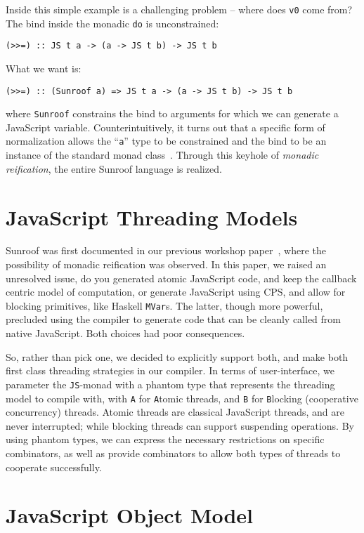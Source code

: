 \documentclass{llncs}
\newcommand{\Src}[1]{{\tt{#1}}}
\newcommand{\JS}{\Src{JS}}
\begin{document}
Inside this simple example is a challenging problem -- where does
\Src{v0} come from? The bind inside the monadic \Src{do} is
unconstrained:
\begin{verbatim}
(>>=) :: JS t a -> (a -> JS t b) -> JS t b
\end{verbatim}
\noindent  What we want is:
\begin{verbatim}
(>>=) :: (Sunroof a) => JS t a -> (a -> JS t b) -> JS t b
\end{verbatim}
\noindent where \Src{Sunroof} constrains the bind to
arguments for which we can generate a JavaScript variable.
Counterintuitively, 
it turns out that a specific form of normalization allows 
the ``\Src{a}'' type to be constrained and the bind to 
be an instance of the standard monad class~\cite{Sculthorpe:13:ConstrainedMonads}.
Through this keyhole of {\em monadic reification\/},
the entire Sunroof language is realized.

\section{JavaScript Threading Models}

Sunroof was first documented in our previous 
workshop paper~\cite{Farmer:12:WebDSLs},
where the possibility of monadic reification was observed.
In this paper, we raised an unresolved issue, do you
generated atomic JavaScript code, and keep the callback
centric model of computation, or generate JavaScript
using CPS, and allow for blocking primitives,
like Haskell \Src{MVar}s. The latter, though more powerful, 
precluded using the compiler to generate
code that can be cleanly called from native JavaScript.
Both choices had poor consequences.

So, rather than pick one, we decided to explicitly support both,
and make both first class threading strategies in our compiler.
In terms of user-interface, we parameter the \JS-monad
with a phantom type that represents the threading model
to compile with, with \Src{A} for \Src{A}tomic threads,
and \Src{B} for \Src{B}locking (cooperative concurrency) threads. 
Atomic threads are classical JavaScript threads, and
are never interrupted; while blocking threads can
support suspending operations. By using phantom
types, we can express the necessary
restrictions on specific combinators, as well
as provide combinators to allow both types of
threads to cooperate successfully.

\section{JavaScript Object Model}
\end{document}
